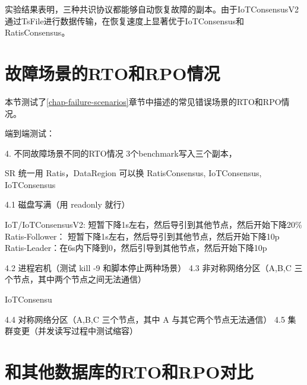 实验结果表明，三种共识协议都能够自动恢复故障的副本。由于IoTConsensusV2通过TsFile进行数据传输，在恢复速度上显著优于IoTConsensus和RatisConsensus。


\section{故障场景的RTO和RPO情况}



本节测试了\ref{chap-failure-scenarios}章节中描述的常见错误场景的RTO和RPO情况。




端到端测试：

4. 不同故障场景不同的RTO情况
3个benchmark写入三个副本，

SR 统一用 Ratis，DataRegion 可以换 RatisConsensus, IoTConsensus, IoTConsensus

4.1 磁盘写满（用 readonly 就行）

IoT/IoTConsensusV2: 短暂下降1s左右，然后导引到其他节点，然后开始下降20\%
Ratis-Follower： 短暂下降1s左右，然后导引到其他节点，然后开始下降10p
Ratis-Leader：在6s内下降到0，然后引导到其他节点，然后开始下降10p



4.2 进程宕机（测试 kill -9 和脚本停止两种场景）
4.3 非对称网络分区（A,B,C 三个节点，其中两个节点之间无法通信）

IoTConsensu


4.4 对称网络分区（A,B,C 三个节点，其中 A 与其它两个节点无法通信）
4.5 集群变更（并发读写过程中测试缩容）




\section{和其他数据库的RTO和RPO对比}
